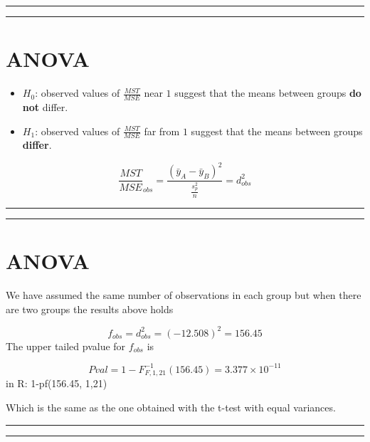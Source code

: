 \documentclass[
]{book}
\begin{document}
\begin{center}\rule{0.5\linewidth}{0.5pt}\end{center}

\begin{center}\rule{0.5\linewidth}{0.5pt}\end{center}

\hypertarget{anova}{%
\section{ANOVA}\label{anova}}

\begin{itemize}
\item
  \(H_0\): observed values of \(\frac{MST}{MSE}\) near \(1\) suggest that the means between groups \textbf{do not} differ.
\item
  \(H_1\): observed values of \(\frac{MST}{MSE}\) far from \(1\) suggest that the means between groups \textbf{differ}.
\end{itemize}

\[\frac{MST}{MSE}_{obs}=\frac{(\bar{y}_{A}-\bar{y}_{B})^2}{\frac{s^2_p}{n}}=d_{obs}^2\]

\begin{center}\rule{0.5\linewidth}{0.5pt}\end{center}

\begin{center}\rule{0.5\linewidth}{0.5pt}\end{center}

\hypertarget{anova-1}{%
\section{ANOVA}\label{anova-1}}

We have assumed the same number of observations in each group but when there are two groups the results above holds

\[f_{obs}=d_{obs}^2=(−12.508)^2=156.45\]
The upper tailed pvalue for \(f_{obs}\) is

\[Pval=1-F^{-1}_{F,1,21}(156.45)=3.377 \times 10^{-11}\]
in R: 1-pf(156.45, 1,21)

Which is the same as the one obtained with the t-test with equal variances.

\begin{center}\rule{0.5\linewidth}{0.5pt}\end{center}

\begin{center}\rule{0.5\linewidth}{0.5pt}\end{center}
\end{document}
